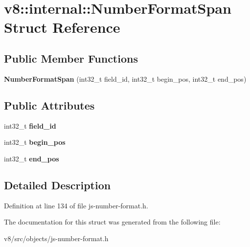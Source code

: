 \hypertarget{structv8_1_1internal_1_1NumberFormatSpan}{}\section{v8\+:\+:internal\+:\+:Number\+Format\+Span Struct Reference}
\label{structv8_1_1internal_1_1NumberFormatSpan}
\subsection*{Public Member Functions}
\begin{DoxyCompactItemize}
\item 
\mbox{\label{structv8_1_1internal_1_1NumberFormatSpan_a932000c9d35afed6f752a509cd5b7100}} 
{\bfseries Number\+Format\+Span} (int32\+\_\+t field\+\_\+id, int32\+\_\+t begin\+\_\+pos, int32\+\_\+t end\+\_\+pos)
\end{DoxyCompactItemize}
\subsection*{Public Attributes}
\begin{DoxyCompactItemize}
\item 
\mbox{\label{structv8_1_1internal_1_1NumberFormatSpan_aef8bb101ffd6024ff51765aaf8f127d1}} 
int32\+\_\+t {\bfseries field\+\_\+id}
\item 
\mbox{\label{structv8_1_1internal_1_1NumberFormatSpan_a567ad8ef941d96a8cca122e2393d81ec}} 
int32\+\_\+t {\bfseries begin\+\_\+pos}
\item 
\mbox{\label{structv8_1_1internal_1_1NumberFormatSpan_a7d8317cafec38fa6bea3c95535097ec6}} 
int32\+\_\+t {\bfseries end\+\_\+pos}
\end{DoxyCompactItemize}


\subsection{Detailed Description}


Definition at line 134 of file js-\/number-\/format.\+h.



The documentation for this struct was generated from the following file\+:\begin{DoxyCompactItemize}
\item 
v8/src/objects/js-\/number-\/format.\+h\end{DoxyCompactItemize}
